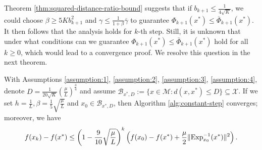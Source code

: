 Theorem \ref{thm:squared-distance-ratio-bound} suggests that if $b_{k+1}\le\frac{1}{4\sqrt{K}}$, we could choose $\beta\ge 5K b_{k+1}^2$ and $\gamma \le\frac{1}{1+\beta}\overline{\gamma}$ to guarantee $\Phi_{k+1}(x^*)\le \overline{\Phi}_{k+1}(x^*)$. It then follows that the analysis holds for $k$-th step. Still, it is unknown that under what conditions can we guarantee $\Phi_{k+1}(x^*)\le \overline{\Phi}_{k+1}(x^*)$ hold for all $k\ge 0$, which would lead to a convergence proof. We resolve this question in the next theorem. 

\begin{theorem} \label{thm:convergence-induction}
	With Assumptions \ref{assumption:1}, \ref{assumption:2}, \ref{assumption:3}, \ref{assumption:4}, denote $D = \frac{1}{20\sqrt{K}}\left(\frac{\mu}{L}\right)^{\frac{3}{4}}$ and assume $\mathcal{B}_{x^*, D}:=\{x\in\mathcal{M}: d(x,x^*)\le D\} \subseteq\mathcal{X}$.
	 If we set $h=\frac{1}{L}, \beta=\frac{1}{5}\sqrt{\frac{\mu}{L}}$ and $x_0 \in \mathcal{B}_{x^*, D}$,
	then Algorithm \ref{alg:constant-step} converges; moreover, we have
	\begin{equation} \label{eq:convergence-rate}
	f(x_k)-f(x^*)\le \left(1-\frac{9}{10}\sqrt{\frac{\mu}{L}}\right)^k\left(f(x_0)-f(x^*)+\frac{\mu}{2}\|\mathrm{Exp}_{x_0}^{-1}(x^*)\|^2\right).
	\end{equation}
\end{theorem}

